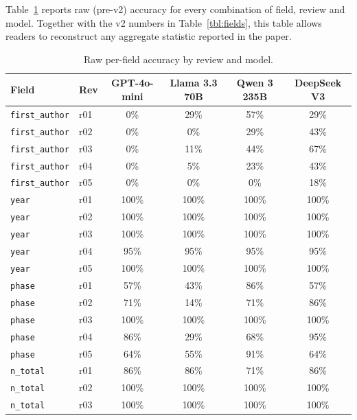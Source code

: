 \documentclass[a4paper,fleqn]{cas-sc}
\begin{document}
Table~\ref{tbl:appendix} reports raw (pre-v2) accuracy for every
combination of field, review and model. Together with the v2 numbers in
Table~\ref{tbl:fields}, this table allows readers to reconstruct any
aggregate statistic reported in the paper.

\begin{table}[ht]
\caption{Raw per-field accuracy by review and model.}
\label{tbl:appendix}
\small
\begin{tabular*}{\tblwidth}{@{}p{3.6cm}p{0.6cm}cccc@{}}
\toprule
Field & Rev & GPT-4o-mini & Llama 3.3 70B & Qwen 3 235B & DeepSeek V3 \\
\midrule
\texttt{first\_author}      & r01 & 0\%   & 29\%  & 57\%  & 29\%  \\
\texttt{first\_author}      & r02 & 0\%   & 0\%   & 29\%  & 43\%  \\
\texttt{first\_author}      & r03 & 0\%   & 11\%  & 44\%  & 67\%  \\
\texttt{first\_author}      & r04 & 0\%   & 5\%   & 23\%  & 43\%  \\
\texttt{first\_author}      & r05 & 0\%   & 0\%   & 0\%   & 18\%  \\
\midrule
\texttt{year}               & r01 & 100\% & 100\% & 100\% & 100\% \\
\texttt{year}               & r02 & 100\% & 100\% & 100\% & 100\% \\
\texttt{year}               & r03 & 100\% & 100\% & 100\% & 100\% \\
\texttt{year}               & r04 & 95\%  & 95\%  & 95\%  & 95\%  \\
\texttt{year}               & r05 & 100\% & 100\% & 100\% & 100\% \\
\midrule
\texttt{phase}              & r01 & 57\%  & 43\%  & 86\%  & 57\%  \\
\texttt{phase}              & r02 & 71\%  & 14\%  & 71\%  & 86\%  \\
\texttt{phase}              & r03 & 100\% & 100\% & 100\% & 100\% \\
\texttt{phase}              & r04 & 86\%  & 29\%  & 68\%  & 95\%  \\
\texttt{phase}              & r05 & 64\%  & 55\%  & 91\%  & 64\%  \\
\midrule
\texttt{n\_total}           & r01 & 86\%  & 86\%  & 71\%  & 86\%  \\
\texttt{n\_total}           & r02 & 100\% & 100\% & 100\% & 100\% \\
\texttt{n\_total}           & r03 & 100\% & 100\% & 100\% & 100\% \\

\end{tabular*}
\end{table}
\end{document}
